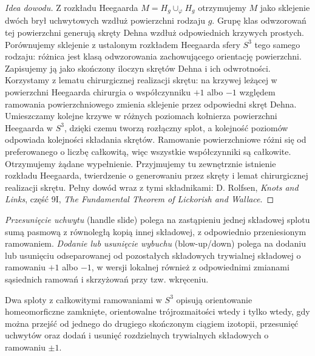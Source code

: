 \begin{proof}[Idea dowodu]
Z rozkładu Heegaarda $M=H_g\cup_\varphi H_g$ otrzymujemy
$M$ jako sklejenie dwóch brył uchwytowych wzdłuż
powierzchni rodzaju $g$. Grupę klas odwzorowań tej
powierzchni generują skręty Dehna wzdłuż odpowiednich
krzywych prostych. Porównujemy sklejenie z ustalonym rozkładem
Heegaarda sfery $S^3$ tego samego rodzaju: różnica
jest klasą odwzorowania zachowującego orientację
powierzchni. Zapisujemy ją jako skończony iloczyn
skrętów Dehna i ich odwrotności. Korzystamy z lematu
chirurgicznej realizacji skrętu: na krzywej leżącej
w powierzchni Heegaarda chirurgia o współczynniku
$+1$ albo $-1$ względem ramowania powierzchniowego
zmienia sklejenie przez odpowiedni skręt Dehna.
Umieszczamy kolejne krzywe w różnych poziomach
kołnierza powierzchni Heegaarda w $S^3$, dzięki czemu
tworzą rozłączny splot, a kolejność poziomów odpowiada
kolejności składania skrętów. Ramowanie powierzchniowe
różni się od preferowanego o liczbę całkowitą,
więc wszystkie współczynniki są całkowite.
Otrzymujemy żądane wypełnienie.
Przyjmujemy tu zewnętrznie istnienie rozkładu Heegaarda,
twierdzenie o generowaniu przez skręty i lemat
chirurgicznej realizacji skrętu. Pełny dowód wraz
z tymi składnikami: D. Rolfsen, \emph{Knots and Links},
część 9I, \emph{The Fundamental Theorem of Lickorish
and Wallace}.
\end{proof}

\begin{definicja}
\emph{Przesunięcie uchwytu} (handle slide) polega na zastąpieniu
jednej składowej splotu sumą pasmową z równoległą kopią
innej składowej, z odpowiednio przeniesionym ramowaniem.
\emph{Dodanie lub usunięcie wybuchu} (blow-up/down)
polega na dodaniu lub usunięciu odseparowanej od pozostałych
składowych trywialnej składowej o ramowaniu $+1$ albo $-1$,
w wersji lokalnej również z odpowiednimi zmianami sąsiednich
ramowań i skrzyżowań przy tzw. wkręceniu.
\end{definicja}

\begin{twierdzenie}
Dwa sploty z całkowitymi ramowaniami w $S^3$ opisują
orientowanie homeomorficzne zamknięte, orientowalne
trójrozmaitości wtedy i tylko wtedy, gdy można przejść
od jednego do drugiego skończonym ciągiem izotopii,
przesunięć uchwytów oraz dodań i usunięć rozdzielnych
trywialnych składowych o ramowaniu $\pm1$.
\end{twierdzenie}

